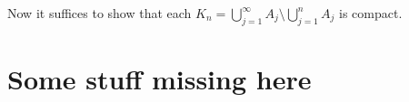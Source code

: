 \documentclass[11pt]{article}
\theoremstyle{definition}
\newcommand{\sm}[0]{\setminus}
\begin{document}
Now it suffices to show that each $K_n=\bigcup_{j=1}^\infty A_j \sm \bigcup_{j=1}^n A_j$ is
compact. 
\qedhere











































\section{Some stuff missing here}
\end{document}
